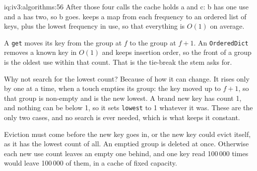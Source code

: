 \begin{solution}{iq:iv3:algorithms:56}
After those four calls the cache holds a and c: b has one use and a has two, so b goes.  keeps a map from each frequency to an ordered list of keys, plus the lowest frequency in use, so that everything is $O(1)$ on average.
\label{lst:iv3:al:lfu}

A \texttt{get} moves its key from the group at $f$ to the group at $f + 1$. An \texttt{OrderedDict} removes a known key in $O(1)$ and keeps insertion order, so the front of a group is the oldest use within that count. That is the tie-break the stem asks for.

Why not search for the lowest count? Because of how it can change. It rises only by one at a time, when a touch empties its group: the key moved up to $f + 1$, so that group is non-empty and is the new lowest. A brand new key has count 1, and nothing can be below 1, so it sets \texttt{lowest} to 1 whatever it was. These are the only two cases, and no search is ever needed, which is what keeps it constant.

Eviction must come before the new key goes in, or the new key could evict itself, as it has the lowest count of all. An emptied group is deleted at once. Otherwise each new use count leaves an empty one behind, and one key read 100\,000 times would leave 100\,000 of them, in a cache of fixed capacity.

\end{solution}

